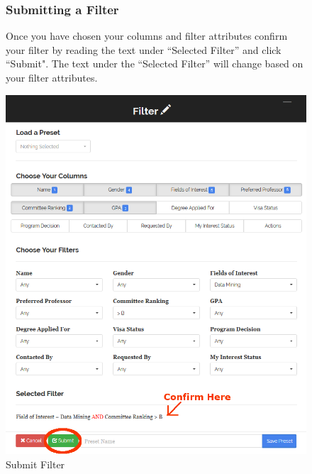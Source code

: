 \documentclass[fontsize=12pt,paper=letter,twoside]{scrartcl}
\begin{document}
\clearpage 
\begin{figure}[!htb]
\subsubsection{Submitting a Filter}
Once you have chosen your columns and filter attributes confirm your filter by reading the text under ``Selected Filter'' and click ``Submit". The text under the ``Selected Filter'' will change based on your filter attributes.
\begin{center}
\includegraphics[width=.99\textwidth]{images/prof/submit_filter.png}
\end{center}
\caption{Submit Filter}
\label{fig:prof/submit_filter}
\end{figure}
\end{document}
